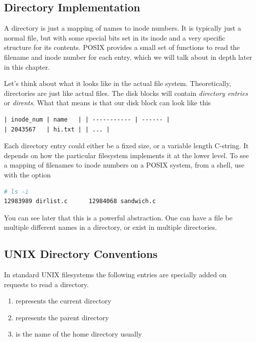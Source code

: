 \subsection{Directory Implementation}

A directory is just a mapping of names to inode numbers.
It is typically just a normal file, but with some special bits set in its inode and a very specific structure for its contents.
POSIX provides a small set of functions to read the filename and inode number for each entry, which we will talk about in depth later in this chapter.

Let's think about what it looks like in the actual file system.
Theoretically, directories are just like actual files.
The disk blocks will contain \emph{directory entries} or \emph{dirents}.
What that means is that our disk block can look like this

\begin{verbatim}
| inode_num | name   | | ----------- | ------ |
| 2043567   | hi.txt | | ... |
\end{verbatim}

Each directory entry could either be a fixed size, or a variable length C-string.
It depends on how the particular filesystem implements it at the lower level.
To see a mapping of filenames to inode numbers on a POSIX system, from a shell, use  with the  option

\begin{lstlisting}[language=bash]
# ls -i
12983989 dirlist.c      12984068 sandwich.c
\end{lstlisting}

You can see later that this is a powerful abstraction.
One can have a file be multiple different names in a directory, or exist in multiple directories.

\subsection{UNIX Directory Conventions}

In standard UNIX filesystems the following entries are specially added on requests to read a directory.

\begin{enumerate}
  \item {} represents the current directory
  \item {} represents the parent directory
  \item \keyword{~~} is the name of the home directory usually
\end{enumerate}

